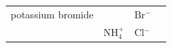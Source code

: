 \begin{enumerate}[noitemsep, label=\textbf{\arabic*}. ]
{{\begin{center}
\begin{tabular}[t]{|l|l|l|l|}
    
        potassium bromide &
    
    
         &
    
    
        \begin{math}\mathrm{Br}{}^{-}\end{math} &
    
    
     \tabularnewline\cline{1-1}\cline{2-2}\cline{3-3}\cline{4-4}
    
    
         &
    
    
        \begin{math}\mathrm{NH}_{4}^{+}\end{math} &
    
    
        \begin{math}\mathrm{Cl}{}^{-}\end{math} &
    
    
     \tabularnewline\cline{1-1}\cline{2-2}\cline{3-3}\cline{4-4}
    

\end{tabular}
\end{center}}}
\end{enumerate}
